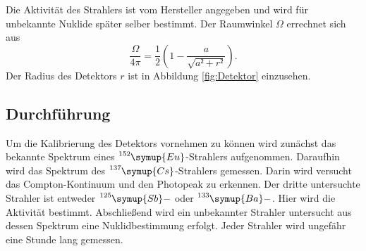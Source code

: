 Die Aktivität des Strahlers ist vom Hersteller angegeben und wird für unbekannte Nuklide später selber bestimmt.
Der Raumwinkel $\Omega$ errechnet sich aus
\begin{equation}
\label{eqn:raum}
\frac{\Omega}{4\pi}=\frac12\left(1-\frac a{\sqrt{a²+r²}}\right).
\end{equation}
Der Radius des Detektors $r$ ist in Abbildung \ref{fig:Detektor} einzusehen.
\subsection{Durchführung}
Um die Kalibrierung des Detektors vornehmen zu können wird zunächst das bekannte Spektrum eines $\ce{^{152}}\symup{Eu}$-Strahlers aufgenommen.
Daraufhin wird das Spektrum des $\ce{^{137}}\symup{Cs}$-Strahlers gemessen.
Darin wird versucht das Compton-Kontinuum und den Photopeak zu erkennen.
Der dritte untersuchte Strahler ist entweder $\ce{^{125}}\symup{Sb}-$ oder $\ce{^{133}}\symup{Ba}-$.
Hier wird die Aktivität bestimmt.
Abschließend wird ein unbekannter Strahler untersucht aus dessen Spektrum eine Nuklidbestimmung erfolgt.
Jeder Strahler wird ungefähr eine Stunde lang gemessen.